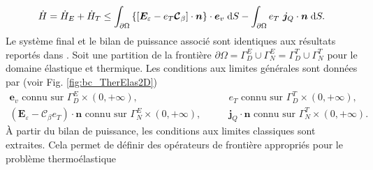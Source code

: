 \begin{equation*}
\begin{aligned}
\dot{H} = \dot{H}_E + \dot{H}_T \le \int_{\partial \Omega} \left\{\left[\bm{E}_\varepsilon - e_T \bm{\mathcal{C}}_\beta \right] \cdot \bm{n}\right\}  \cdot \bm{e}_v  \d{S} - \int_{\partial\Omega} e_T \ \bm{j}_Q \cdot \bm{n} \d{S}.
\end{aligned}
\end{equation*}
Le système final et le bilan de puissance associé sont identiques aux résultats reportés dans \cite[page 326, 332]{carlson1973}. Soit une partition de la frontière $\partial \Omega = \Gamma_D^E \cup \Gamma_N^E = \Gamma_D^T \cup \Gamma_N^T$ pour le domaine élastique et thermique. Les conditions aux limites générales sont données par (voir Fig. \ref{fig:bc_TherElas2D})
\begin{equation*}
\begin{aligned}
\bm{e}_v \text{ connu sur } \Gamma_D^E \times (0, +\infty), \\
(\bm{E}_\varepsilon - \bm{\mathcal{C}}_\beta e_T) \cdot \bm{n} \text{ connu sur } \Gamma_N^E \times (0, +\infty), 
\end{aligned} \qquad
\begin{aligned}
e_T \text{ connu sur } \Gamma_D^T \times (0, +\infty), \\
\bm{j}_Q \cdot \bm{n} \text{ connu sur } \Gamma_N^T \times (0, +\infty).
\end{aligned}
\end{equation*}
À partir du bilan de puissance, les conditions aux limites classiques sont extraites. Cela permet de définir des opérateurs de frontière appropriés pour le problème thermoélastique
